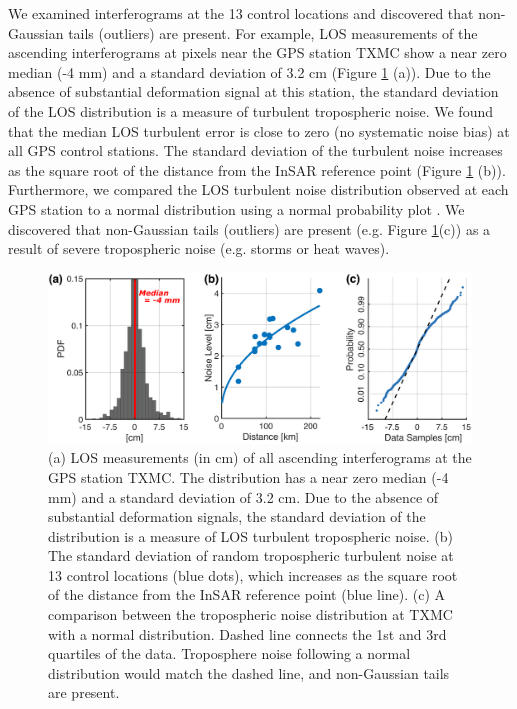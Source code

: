 We examined interferograms at the 13 control locations and discovered that non-Gaussian tails (outliers) are present. For example, LOS measurements of the ascending interferograms at pixels near the GPS station TXMC show a near zero median (-4 mm) and a standard deviation of 3.2 cm (Figure \ref{fig:ch4-outliers} (a)). Due to the absence of substantial deformation signal at this station, the standard deviation of the LOS distribution is a measure of turbulent tropospheric noise.  We found that the median LOS turbulent error is close to zero (no systematic noise bias) at all GPS control stations. The standard deviation of the turbulent noise increases as the square root of the distance from the InSAR reference point (Figure \ref{fig:ch4-outliers} (b)). Furthermore, we compared the LOS turbulent noise distribution observed at each GPS station to a normal distribution using a normal probability plot \citep{Filliben1975ProbabilityPlotCorrelation}. We discovered that non-Gaussian tails (outliers) are present (e.g. Figure \ref{fig:ch4-outliers}(c)) as a result of severe tropospheric noise (e.g. storms or heat waves). 



\begin{figure}
	\centering
	\includegraphics[width=0.99\linewidth]{figures/chapter4-grl/outlier-top-only.pdf}
	\caption[Noise measurement and tropospheric outliers]{
		(a) LOS measurements (in cm) of all ascending interferograms at the GPS station TXMC. The distribution has a near zero median (-4 mm) and a standard deviation of 3.2 cm. Due to the absence of substantial deformation signals, the standard deviation of the distribution is a measure of LOS turbulent tropospheric noise. (b) The standard deviation of random tropospheric turbulent noise at 13 control locations (blue dots), which increases as the square root of the distance from the InSAR reference point (blue line). (c) A comparison between the tropospheric noise distribution at TXMC with a normal distribution. Dashed line connects the 1st and 3rd quartiles of the data. Troposphere noise following a normal distribution would match the dashed line, and non-Gaussian tails are present. 
	}
	\label{fig:ch4-outliers}
\end{figure}



